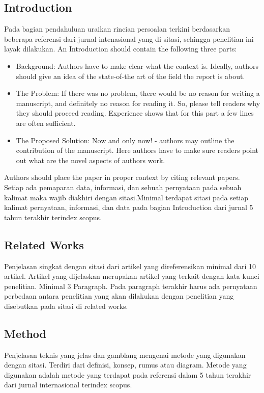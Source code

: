 \subsection{Introduction}
Pada bagian pendahuluan uraikan rincian persoalan terkini berdasarkan beberapa referensi dari jurnal intenasional yang di sitasi, sehingga penelitian ini layak dilakukan. An Introduction should contain the following three parts:
\begin{itemize}
    \item Background: Authors have to make clear what the context is. Ideally, authors should give an idea of the state-of-the art of the field the report is about.
    \item  The Problem: If there was no problem, there would be no reason for writing a manuscript, and definitely no reason for reading it. So, please tell readers why they should proceed reading. Experience shows that for this part a few lines are often sufficient.
    \item The Proposed Solution: Now and only now! - authors may outline the contribution of the manuscript. Here authors have to make sure readers point out what are the novel aspects of authors work.
\end{itemize}
Authors should place the paper in proper context by citing relevant papers. Setiap ada pemaparan data, informasi, dan sebuah pernyataan pada sebuah kalimat maka wajib diakhiri dengan sitasi.Minimal terdapat sitasi pada setiap kalimat pernyataan, informasi, dan data pada bagian Introduction dari jurnal 5 tahun terakhir terindex scopus.

\subsection{Related Works}
Penjelasan singkat dengan sitasi dari artikel yang direferensikan minimal dari 10 artikel. Artikel yang dijelaskan merupakan artikel yang terkait dengan kata kunci penelitian. Minimal 3 Paragraph. Pada paragraph terakhir harus ada pernyataan perbedaan antara penelitian yang akan dilakukan dengan penelitian yang disebutkan pada sitasi di related works.

\subsection{Method}
Penjelasan teknis yang jelas dan gamblang mengenai metode yang digunakan dengan sitasi. Terdiri dari definisi, konsep, rumus atau diagram. Metode yang digunakan adalah metode yang terdapat pada referensi dalam 5 tahun terakhir  dari  jurnal  internasional  terindex  scopus. 

